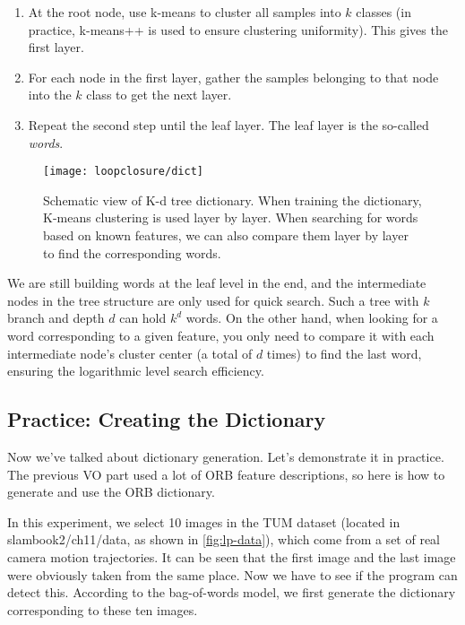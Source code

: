 \begin{mdframed}
	\begin{enumerate}
		\item At the root node, use k-means to cluster all samples into $k$ classes (in practice, k-means++ is used to ensure clustering uniformity). This gives the first layer.
		\item For each node in the first layer, gather the samples belonging to that node into the $k$ class to get the next layer.
		\item Repeat the second step until the leaf layer. The leaf layer is the so-called \textit{words}.
	\end{enumerate}
\end{mdframed}

\begin{figure}[!ht]
	\centering
	\texttt{[image: loopclosure/dict]}
	\caption{Schematic view of K-d tree dictionary. When training the dictionary, K-means clustering is used layer by layer. When searching for words based on known features, we can also compare them layer by layer to find the corresponding words.}
	\label{fig:lp-dict}
\end{figure}

We are still building words at the leaf level in the end, and the intermediate nodes in the tree structure are only used for quick search. Such a tree with $k$ branch and depth $d$ can hold $k^d$ words. On the other hand, when looking for a word corresponding to a given feature, you only need to compare it with each intermediate node's cluster center (a total of $d$ times) to find the last word, ensuring the logarithmic level search efficiency.

\subsection{Practice: Creating the Dictionary}
Now we've talked about dictionary generation. Let's demonstrate it in practice. The previous VO part used a lot of ORB feature descriptions, so here is how to generate and use the ORB dictionary.

In this experiment, we select 10 images in the TUM dataset (located in slambook2/ch11/data, as shown in \autoref{fig:lp-data}), which come from a set of real camera motion trajectories. It can be seen that the first image and the last image were obviously taken from the same place. Now we have to see if the program can detect this. According to the bag-of-words model, we first generate the dictionary corresponding to these ten images.

